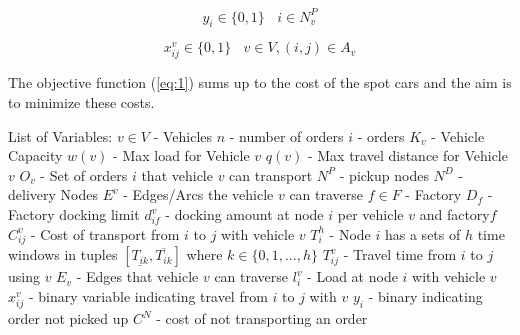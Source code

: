 \documentclass[a4paper,12pt]{article}
\begin{document}
\begin{equation} \label{eq:14}
y_i \in \{0, 1\} ~~~~ i \in N_v^P
\end{equation}

\begin{equation} \label{eq:15}
x_{ij}^v \in \{0, 1\} ~~~~ v \in V, (i, j) \in A_v
\end{equation}





\par
The objective function (\ref{eq:1}) sums up to the cost of the spot cars and the aim is to minimize these costs. \newline \newline


List of Variables: \newline
$v \in V$ - Vehicles \newline
$n$ - number of orders\newline
$i$ - orders\newline
$K_v$ - Vehicle Capacity \newline
$w(v)$ - Max load for Vehicle $v$ \newline
$q(v)$ - Max travel distance for Vehicle $v$ \newline
$O_v$ - Set of orders $i$ that vehicle $v$ can transport \newline
$N^P$ - pickup nodes\newline
$N^D$ - delivery Nodes\newline
$E^v$ - Edges/Arcs the vehicle $v$ can traverse
$f \in F$ - Factory\newline
$D_f$ - Factory docking limit\newline
$d_{if}^v$ - docking amount at node $i$ per vehicle $v$ and factory$f$ \newline
$C_{ij}^{v}$ - Cost of transport from $i$ to $j$ with vehicle $v$ \newline
$T_i^h$ - Node $i$ has a sets of $h$ time windows in tuples $[ \underline{T_{ik}},  \overline{T_{ik}} ]$ where $k \in \{0,1,...,h\}$  \newline
$T_{ij}^v$ - Travel time from $i$ to $j$ using $v$
$E_v$ - Edges that vehicle $v$ can traverse \newline
$l_{i}^v$ - Load at node $i$ with vehicle $v$ \newline
$x_{ij}^v$ - binary variable indicating travel from $i$ to $j$ with $v$ \newline
$y_i$ - binary indicating order not picked up \newline
$C^N$ - cost of not transporting an order \newline
\end{document}
